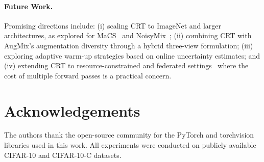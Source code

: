 \documentclass[10pt,twocolumn]{article}
\begin{document}
\paragraph{Future Work.} Promising directions include: (i) scaling CRT to ImageNet and larger architectures, as explored for MaCS~\cite{khazem2026macs} and NoisyMix~\cite{erichson2024noisymix}; (ii) combining CRT with AugMix's augmentation diversity through a hybrid three-view formulation; (iii) exploring adaptive warm-up strategies based on online uncertainty estimates; and (iv) extending CRT to resource-constrained and federated settings~\cite{bekdache2025federl} where the cost of multiple forward passes is a practical concern.

\section*{Acknowledgements}

The authors thank the open-source community for the PyTorch and torchvision libraries used in this work. All experiments were conducted on publicly available CIFAR-10 and CIFAR-10-C datasets.


\end{document}
